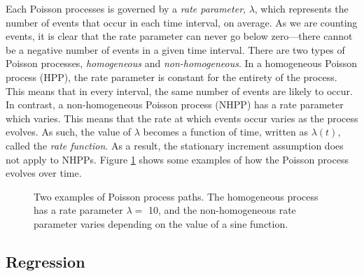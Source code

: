 \documentclass[a4paper,11pt,twoside]{article}
\begin{document}
   Each Poisson processes is governed by a \emph{rate parameter}, $\lambda$,
   which represents the number of events that occur in each time interval, on
   average. As we are counting events, it is clear that the rate parameter can
   never go below zero---there cannot be a negative number of events in a given
   time interval. There are two types of Poisson processes, \emph{homogeneous}
   and \emph{non-homogeneous}. In a homogeneous Poisson process (HPP), the rate
   parameter is constant for the entirety of the process. This means that in
   every interval, the same number of events are likely to occur. In contrast, a
   non-homogeneous Poisson process (NHPP) has a rate parameter which
   varies. This means that the rate at which events occur varies as the process
   evolves. As such, the value of $\lambda$ becomes a function of time, written
   as $\lambda(t)$, called the \emph{rate function}. As a result, the stationary
   increment assumption does not apply to NHPPs. Figure \ref{fig:poisson} shows
   some examples of how the Poisson process evolves over time.
   \begin{figure}
   \caption{Two examples of Poisson process paths. The homogeneous process has a
   rate parameter $\lambda=$ 10, and the non-homogeneous rate parameter varies
   depending on the value of a sine function.}
   \label{fig:poisson}
   \end{figure}
\subsection{Regression}
\label{sec-2-3}
\end{document}
